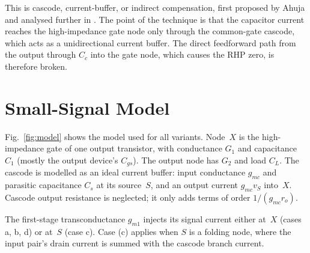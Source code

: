 \documentclass[journal]{IEEEtran}
\newcommand{\gmo}{g_{m1}}
\newcommand{\gmc}{g_{mc}}
\begin{document}
This is cascode, current-buffer, or indirect compensation, first proposed by Ahuja \cite{ahuja1983} and analysed further in \cite{ribner1984,palmisano1997,hurst2004,saxena2007}. The point of the technique is that the capacitor current reaches the high-impedance gate node only through the common-gate cascode, which acts as a unidirectional current buffer. The direct feedforward path from the output through $C_c$ into the gate node, which causes the RHP zero, is therefore broken.

\section{Small-Signal Model}
Fig.~\ref{fig:model} shows the model used for all variants. Node~$X$ is the high-impedance gate of one output transistor, with conductance $G_1$ and capacitance $C_1$ (mostly the output device's $C_{gs}$). The output node has $G_2$ and load $C_L$. The cascode is modelled as an ideal current buffer: input conductance $\gmc$ and parasitic capacitance $C_s$ at its source~$S$, and an output current $\gmc v_S$ into~$X$. Cascode output resistance is neglected; it only adds terms of order $1/(\gmc r_o)$.

The first-stage transconductance $\gmo$ injects its signal current either at~$X$ (cases a, b, d) or at~$S$ (case c). Case (c) applies when $S$ is a folding node, where the input pair's drain current is summed with the cascode branch current.
\end{document}
